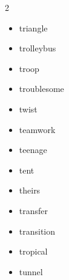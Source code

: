\documentclass[../../book.tex]{subfiles}
\begin{document}
\begin{multicols}{2}
\begin{itemize}
\item[-] triangle
\item[-] trolleybus
\item[-] troop
\item[-] troublesome
\item[-] twist
\item[-] teamwork
\item[-] teenage
\item[-] tent
\item[-] theirs
\item[-] transfer
\item[-] transition
\item[-] tropical
\item[-] tunnel
\end{itemize}
\end{multicols}
\end{document}
